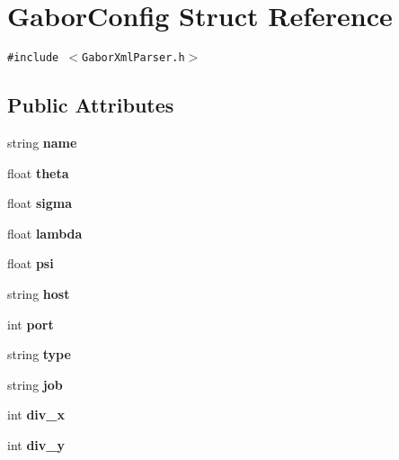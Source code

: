 \hypertarget{structGaborConfig}{
\section{GaborConfig Struct Reference}
\label{structGaborConfig}
}
{\tt \#include $<$GaborXmlParser.h$>$}

\subsection*{Public Attributes}
\begin{CompactItemize}
\item 
\hypertarget{structGaborConfig_5c4b3606ac42e45ca8e27aa0ecb6a0d8}{
string \textbf{name}}
\label{structGaborConfig_5c4b3606ac42e45ca8e27aa0ecb6a0d8}

\item 
\hypertarget{structGaborConfig_e68e5e46dc3384acb94a4ce14d5d3da5}{
float \textbf{theta}}
\label{structGaborConfig_e68e5e46dc3384acb94a4ce14d5d3da5}

\item 
\hypertarget{structGaborConfig_9fd9c3e846fb6fb6d73e1be1b6eca978}{
float \textbf{sigma}}
\label{structGaborConfig_9fd9c3e846fb6fb6d73e1be1b6eca978}

\item 
\hypertarget{structGaborConfig_3919dbad205f2f79f4733ab32437246e}{
float \textbf{lambda}}
\label{structGaborConfig_3919dbad205f2f79f4733ab32437246e}

\item 
\hypertarget{structGaborConfig_db61b0ef522d31bc3e144b6aeaf2cc7d}{
float \textbf{psi}}
\label{structGaborConfig_db61b0ef522d31bc3e144b6aeaf2cc7d}

\item 
\hypertarget{structGaborConfig_deb41a4301b808dd0c9f49d5d51e88a8}{
string \textbf{host}}
\label{structGaborConfig_deb41a4301b808dd0c9f49d5d51e88a8}

\item 
\hypertarget{structGaborConfig_16a2fc1b1c30d8090292e07df3f1e232}{
int \textbf{port}}
\label{structGaborConfig_16a2fc1b1c30d8090292e07df3f1e232}

\item 
\hypertarget{structGaborConfig_7044ac4e6b529bdb8793d98cdf89f7c4}{
string \textbf{type}}
\label{structGaborConfig_7044ac4e6b529bdb8793d98cdf89f7c4}

\item 
\hypertarget{structGaborConfig_590757c2cfccecffb76094073b039771}{
string \textbf{job}}
\label{structGaborConfig_590757c2cfccecffb76094073b039771}

\item 
\hypertarget{structGaborConfig_bfd19b7fe6482e666a9bad8384525b9c}{
int \textbf{div\_\-x}}
\label{structGaborConfig_bfd19b7fe6482e666a9bad8384525b9c}

\item 
\hypertarget{structGaborConfig_615da0b2e3e64fe52ea1b8bd00f7ae25}{
int \textbf{div\_\-y}}
\label{structGaborConfig_615da0b2e3e64fe52ea1b8bd00f7ae25}

\end{CompactItemize}


